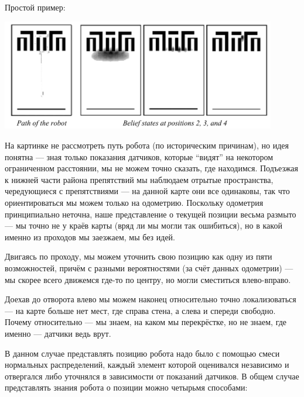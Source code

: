 \documentclass{../../text-style}
\begin{document}
Простой пример:

\begin{center}
    \includegraphics[width=0.9\textwidth]{uncertainity.png}
\end{center}

На картинке не рассмотреть путь робота (по историческим причинам), но идея понятна --- зная только показания датчиков, которые \enquote{видят} на некотором ограниченном расстоянии, мы не можем точно сказать, где находимся.
Подъезжая к нижней части района препятствий мы наблюдаем отрытые пространства, чередующиеся с препятствиями --- на данной карте они все одинаковы, так что ориентироваться мы можем только на одометрию.
Поскольку одометрия принципиально неточна, наше представление о текущей позиции весьма размыто --- мы точно не у краёв карты (вряд ли мы могли так ошибиться), но в какой именно из проходов мы заезжаем, мы без идей.

Двигаясь по проходу, мы можем уточнить свою позицию как одну из пяти возможностей, причём с разными вероятностями (за счёт данных одометрии) --- мы скорее всего движемся где-то по центру, но могли сместиться влево-вправо.

Доехав до отворота влево мы можем наконец относительно точно локализоваться --- на карте больше нет мест, где справа стена, а слева и спереди свободно.
Почему относительно --- мы знаем, на каком мы перекрёстке, но не знаем, где именно --- датчики ведь врут.

В данном случае представлять позицию робота надо было с помощью смеси нормальных распределений, каждый элемент которой оценивался независимо и отвергался либо уточнялся в зависимости от показаний датчиков. В общем случае представлять знания робота о позиции можно четырьмя способами:
\end{document}

